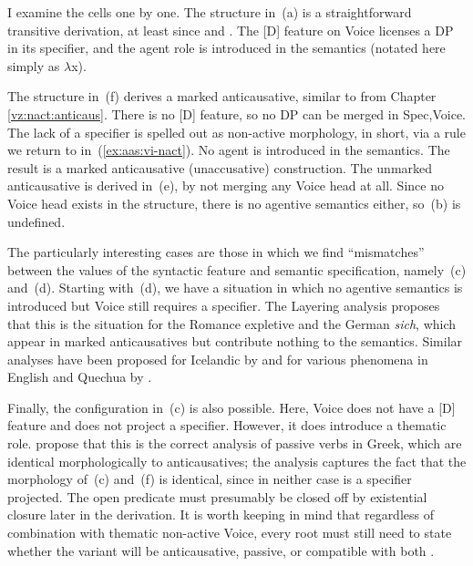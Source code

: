 I examine the cells one by one. The structure in~(\lastx a) is a straightforward transitive derivation, at least since \cite{kratzer96} and \citep{pylkkanen08}. The [D] feature on Voice licenses a DP in its specifier, and the agent role is introduced in the semantics (notated here simply as $\lambda$x).

The structure in~(\lastx f) derives a marked anticausative, similar to {\tnif} from Chapter \ref{vz:nact:anticaus}. There is no [D] feature, so no DP can be merged in Spec,Voice. The lack of a specifier is spelled out as non-active morphology,  in short, via a rule we return to in~(\ref{ex:aas:vi-nact}). No agent is introduced in the semantics. The result is a marked anticausative (unaccusative) construction. The unmarked anticausative is derived in~(\lastx e), by not merging any Voice head at all. Since no Voice head exists in the structure, there is no agentive semantics either, so~(\lastx b) is undefined.

The particularly interesting cases are those in which we find ``mismatches'' between the values of the syntactic feature and semantic specification, namely~(\lastx c) and~(\lastx d). Starting with~(\lastx d), we have a situation in which no agentive semantics is introduced but Voice still requires a specifier. The Layering analysis proposes that this is the situation for the Romance expletive  and the German \emph{sich}, which appear in marked anticausatives but contribute nothing to the semantics. Similar analyses have been proposed for Icelandic by \cite{wood14nllt,wood15springer} and for various phenomena in English and Quechua by \cite{myler16mit}.

Finally, the configuration in~(\lastx c) is also possible. Here, Voice does not have a [D] feature and does not project a specifier. However, it does introduce a thematic role. \cite{layering15} propose that this is the correct analysis of passive verbs in Greek, which are identical morphologically to anticausatives; the analysis captures the fact that the morphology of~(\lastx c) and~(\lastx f) is identical, since in neither case is a specifier projected. The open predicate must presumably be closed off by existential closure later in the derivation. It is worth keeping in mind that regardless of combination with thematic non-active Voice, every root must still need to state whether the  variant will be anticausative, passive, or compatible with both \citep[88]{alexiadouanagnostopoulou04,layering15}.


